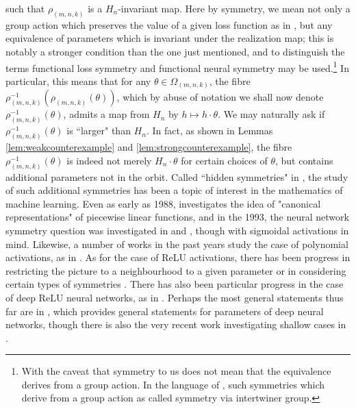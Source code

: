 \documentclass[11pt,letterpaper]{amsart}
\begin{document}
such that $\rho_{(m, n,k)}$ is a $H_n$-invariant map. Here by symmetry, we mean not only a group action which preserves the value of a given loss function as in \cite[Def. 3.1]{zhao2023symmetriesflatminimaconserved}, but any equivalence of parameters which is invariant under the realization map; this is notably a stronger condition than the one just mentioned, and to distinguish the terms functional loss symmetry \cite[Def. 2.6]{zhao2025symmetryneuralnetworkparameter} and functional neural symmetry \cite[Def. 2.4]{zhao2025symmetryneuralnetworkparameter} may be used.\footnote{With the caveat that symmetry to us does not mean that the equivalence derives from a group action. In the language of \cite{godfrey2023symmetriesdeeplearningmodels}, such symmetries which derive from a group action as called symmetry via intertwiner group.} In particular, this means that for any $\theta\in \Omega_{(m,n,k)}$, the fibre $\rho_{(m,n,k)}^{-1}(\rho_{(m,n,k)}(\theta))$, which by abuse of notation we shall now denote $\rho^{-1}_{(m,n,k)}(\theta)$, admits a map from $H_n$ by $h\mapsto h\cdot \theta$. We may naturally ask if $\rho_{(m,n,k)}^{-1}(\theta)$ is ``larger" than $H_n$. In fact, as shown in Lemmas \ref{lem:weakcounterexample} and \ref{lem:strongcounterexample}, the fibre $\rho_{(m,n,k)}^{-1}(\theta)$ is indeed not merely $H_n\cdot \theta$ for certain choices of $\theta$, but contains additional parameters not in the orbit. Called ``hidden symmetries" in \cite[Def. F.4]{pmlr-v202-grigsby23a}, the study of such additional symmetries has been a topic of interest in the mathematics of machine learning. Even as early as 1988, \cite{Chua1988CanonicalPR} investigates the idea of "canonical representations" of piecewise linear functions, and in the 1993, the neural network symmetry question was investigated in \cite{NIPS1993_e49b8b40_Fefferman_Market} and \cite{ALBERTINI1993975}, though with sigmoidal activations in mind. Likewise, a number of works in the past years study the case of polynomial activations, as in \cite{Finkel_2025, kileel2019expressivepowerdeeppolynomial}. As for the case of ReLU activations, there has been progress in restricting the picture to a neighbourhood to a given parameter \cite{Elisenda_Grigsby_2025, Stock_2022, bonapellissier2022localidentifiabilitydeeprelu} or in considering certain types of symmetries \cite{PetzkaHenning2Layer, zhao2023symmetriesflatminimaconserved}. There has also been particular progress in the case of deep ReLU neural networks, as in \cite{pmlr-v202-grigsby23a, phuong2020functional, bonapellissier2026geometryinducedregularizationdeeprelu}. Perhaps the most general statements thus far are in \cite{pmlr-v119-rolnick20a, zhang2026completeidentificationdeeprelu}, which provides general statements for parameters of deep neural networks, though there is also the very recent work investigating shallow cases in \cite{grillo2026relunetworksadmitidentifiable, gegenfurtner2026symmetriesthreelayerrelunetworks}.
\end{document}
